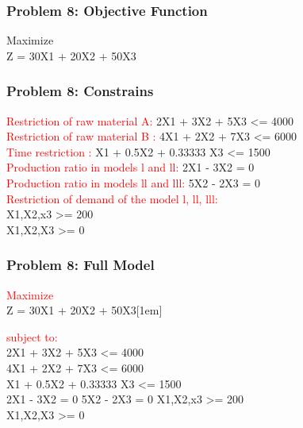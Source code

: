 \documentclass[10pt,svgnames,fragile]{beamer}
\begin{document}
\begin{frame}[label={sec:orge9abdcb}]{}

\frametitle{Problem 8: Objective Function }
Maximize\\[1em]

Z =  30X1 + 20X2 + 50X3


\end{frame}

\begin{frame}[label={sec:orge9abdcb}]{}
\frametitle{Problem 8: Constrains }
\textcolor{red}{Restriction of raw material A:} 2X1 + 3X2 + 5X3 <= 4000\\[1em]

\textcolor{red}{Restriction of raw material B :} 4X1 + 2X2 + 7X3 <= 6000\\[1em]

\textcolor{red}{Time restriction :} X1 + 0.5X2 + 0.33333 X3 <= 1500\\[1em]

\textcolor{red}{Production ratio in models l and ll:} 2X1 - 3X2 = 0\\[1em]

\textcolor{red}{Production ratio in models ll and lll:} 5X2 - 2X3 = 0\\[1em]

\textcolor{red}{Restriction of demand of the model l, ll, lll:}\\[1em]
X1,X2,x3  >= 200\\


X1,X2,X3   >= 0\\

\end{frame}

\begin{frame}[label={sec:orge9abdcb}]{}
\frametitle{Problem 8: Full Model }
\textcolor{red}{Maximize}\\[1em]

Z =  30X1 + 20X2 + 50X3[1em]

\textcolor{red}{subject to:}\\[1em]
2X1 + 3X2 + 5X3 <= 4000\\
4X1 + 2X2 + 7X3 <= 6000\\
X1 + 0.5X2 + 0.33333 X3 <= 1500\\
2X1 - 3X2 = 0
5X2 - 2X3 = 0
X1,X2,x3  >= 200\\
X1,X2,X3   >= 0\\

\end{frame}
\end{document}

